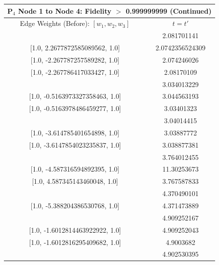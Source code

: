 \documentclass[reprint, aps, 12pt, floatfix]{revtex4-2}
\begin{document}
\begin{center}
    \begin{tabular}{||c c||}
        \multicolumn{2}{c}{P$_4$ Node 1 to Node 4: Fidelity $>$ 0.999999999 (Continued)}\\
        \hline
        Edge Weights (Before): $[w_1,w_2,w_3]$&$t=t'$\\
        \hline
        [1.0, 2.2677864162435357, 1.0]&2.081701141\\

        [1.0, 2.2677872585089562, 1.0]&2.0742356524309\\

        [1.0, -2.267787257589282, 1.0]&2.074246026\\

        [1.0, -2.267786417033427, 1.0]&2.08170109\\
        \hline
        [1.0, 0.5163978486429714, 1.0]&3.034013229\\
        
        [1.0, -0.5163973327358463, 1.0]&3.044563193\\

        [1.0, -0.5163978486459277, 1.0]&3.03401323\\
        \hline
        [1.0, 3.614820251255397, 1.0]&3.04014415\\
        
        [1.0, -3.614785401654898, 1.0]&3.03887772\\

        [1.0, -3.6147854023235837, 1.0]&3.038877381\\
        \hline
        [1.0, -4.587318653298133, 1.0]&3.764012455\\
        
        [1.0, -4.587316594892395, 1.0]&11.30253673\\

        [1.0, 4.587345143460048, 1.0]&3.767587833\\
        \hline
        [1.0, 5.388161262251575, 1.0]&4.370490101\\

        [1.0, -5.388204386530768, 1.0]&4.371473889\\
        \hline
        [1.0, -1.6012814463605203, 1.0]&4.909252167\\

        [1.0, -1.6012814463922922, 1.0]&4.909252043\\

        [1.0, -1.6012816295409682, 1.0]&4.9003682\\
        \hline
        [1.0, 6.084872739875749, 1.0]&4.902530395\\


\end{tabular}
\end{center}
\end{document}
